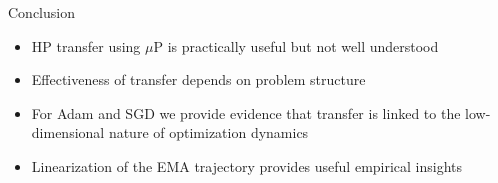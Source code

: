 \documentclass{beamer}
\begin{document}
\begin{frame}{Conclusion}
\begin{itemize}
    \item HP transfer using $\mu$P is practically useful but not well understood

    \vspace{4mm}

    \item Effectiveness of transfer depends on problem structure

    \vspace{4mm}

    \item For Adam and SGD we provide evidence that transfer is linked to the low-dimensional nature of optimization dynamics 

    \vspace{4mm}

    \item Linearization of the EMA trajectory provides useful empirical insights
\end{itemize}
    
\end{frame}
\end{document}
